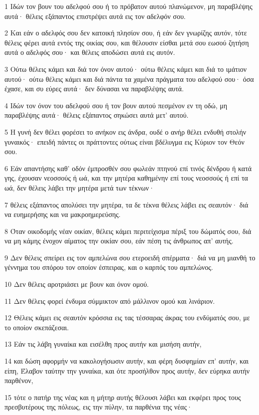 \par 1 Ιδών τον βουν του αδελφού σου ή το πρόβατον αυτού πλανώμενον, μη παραβλέψης αυτά· θέλεις εξάπαντος επιστρέψει αυτά εις τον αδελφόν σου.
\par 2 Και εάν ο αδελφός σου δεν κατοική πλησίον σου, ή εάν δεν γνωρίζης αυτόν, τότε θέλεις φέρει αυτά εντός της οικίας σου, και θέλουσιν είσθαι μετά σου εωσού ζητήση αυτά ο αδελφός σου· και θέλεις αποδώσει αυτά εις αυτόν.
\par 3 Ούτω θέλεις κάμει και διά τον όνον αυτού· ούτω θέλεις κάμει και διά το ιμάτιον αυτού· ούτω θέλεις κάμει και διά πάντα τα χαμένα πράγματα του αδελφού σου· όσα έχασε, και συ εύρες αυτά· δεν δύνασαι να παραβλέψης αυτά.
\par 4 Ιδών τον όνον του αδελφού σου ή τον βουν αυτού πεσμένον εν τη οδώ, μη παραβλέψης αυτά· θέλεις εξάπαντος σηκώσει αυτά μετ' αυτού.
\par 5 Η γυνή δεν θέλει φορέσει το ανήκον εις άνδρα, ουδέ ο ανήρ θέλει ενδυθή στολήν γυναικός· επειδή πάντες οι πράττοντες ούτως είναι βδέλυγμα εις Κύριον τον Θεόν σου.
\par 6 Εάν απαντήσης καθ' οδόν έμπροσθέν σου φωλεάν πτηνού επί τινός δένδρου ή κατά γης, έχουσαν νεοσσούς ή ωά, και την μητέρα καθημένην επί τους νεοσσούς ή επί τα ωά, δεν θέλεις λάβει την μητέρα μετά των τέκνων·
\par 7 θέλεις εξάπαντος απολύσει την μητέρα, τα δε τέκνα θέλεις λάβει εις σεαυτόν· διά να ευημερήσης και να μακροημερεύσης.
\par 8 Όταν οικοδομής νέαν οικίαν, θέλεις κάμει περιτείχισμα πέριξ του δώματός σου, διά να μη κάμης ένοχον αίματος την οικίαν σου, εάν πέση τις άνθρωπος απ' αυτής.
\par 9 Δεν θέλεις σπείρει εις τον αμπελώνα σου ετεροειδή σπέρματα· διά να μη μιανθή το γέννημα του σπόρου τον οποίον έσπειρας, και ο καρπός του αμπελώνος.
\par 10 Δεν θέλεις αροτριάσει με βουν και όνον ομού.
\par 11 Δεν θέλεις φορεί ένδυμα σύμμικτον από μάλλινον ομού και λινάριον.
\par 12 Θέλεις κάμει εις σεαυτόν κρόσσια εις τας τέσσαρας άκρας του ενδύματός σου, με το οποίον σκεπάζεσαι.
\par 13 Εάν τις λάβη γυναίκα και εισέλθη προς αυτήν και μισήση αυτήν,
\par 14 και δώση αφορμήν να κακολογήσωσιν αυτήν, και φέρη δυσφημίαν επ' αυτήν, και είπη, Έλαβον ταύτην την γυναίκα, και ότε προσήλθον προς αυτήν, δεν εύρηκα αυτήν παρθένον,
\par 15 τότε ο πατήρ της νέας και η μήτηρ αυτής θέλουσι λάβει και εκφέρει προς τους πρεσβυτέρους της πόλεως, εις την πύλην, τα παρθένια της νέας·
